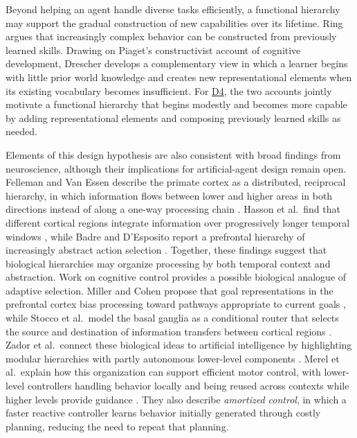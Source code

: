 \documentclass[10pt,journal,compsoc]{IEEEtran}
\DeclareRobustCommand{\Dref}[1]{\hyperref[sec:d#1]{D#1}}
\begin{document}
Beyond helping an agent handle diverse tasks efficiently, a functional hierarchy may support the gradual construction of new capabilities over its lifetime.
Ring \cite{ring1997} argues that increasingly complex behavior can be constructed from previously learned skills.
Drawing on Piaget's constructivist account of cognitive development, Drescher \cite{drescher1991} develops a complementary view in which a learner begins with little prior world knowledge and creates new representational elements when its existing vocabulary becomes insufficient.
For \Dref{4}, the two accounts jointly motivate a functional hierarchy that begins modestly and becomes more capable by adding representational elements and composing previously learned skills as needed.

Elements of this design hypothesis are also consistent with broad findings from neuroscience, although their implications for artificial-agent design remain open.
Felleman and Van Essen describe the primate cortex as a distributed, reciprocal hierarchy, in which information flows between lower and higher areas in both directions instead of along a one-way processing chain \cite{felleman1991}.
Hasson et al.\ find that different cortical regions integrate information over progressively longer temporal windows \cite{hasson2008}, while Badre and D'Esposito report a prefrontal hierarchy of increasingly abstract action selection \cite{badre2007}.
Together, these findings suggest that biological hierarchies may organize processing by both temporal context and abstraction.
Work on cognitive control provides a possible biological analogue of adaptive selection.
Miller and Cohen propose that goal representations in the prefrontal cortex bias processing toward pathways appropriate to current goals \cite{miller2001}, while Stocco et al.\ model the basal ganglia as a conditional router that selects the source and destination of information transfers between cortical regions \cite{stocco2010}.
Zador et al.\ connect these biological ideas to artificial intelligence by highlighting modular hierarchies with partly autonomous lower-level components \cite{zador2023}.
Merel et al.\ explain how this organization can support efficient motor control, with lower-level controllers handling behavior locally and being reused across contexts while higher levels provide guidance \cite{merel2019}.
They also describe \emph{amortized control}, in which a faster reactive controller learns behavior initially generated through costly planning, reducing the need to repeat that planning.
\end{document}
